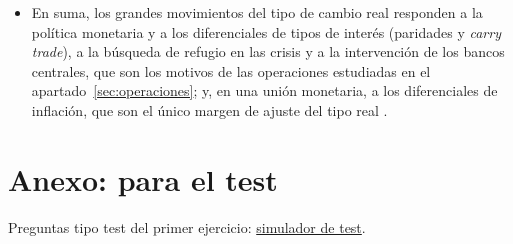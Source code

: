 \documentclass[11pt]{article}
\begin{document}
\begin{itemize}
\begin{itemize}
  \item \emph{libra}: se apreció con fuerza entre 1996 y 1998 y se mantuvo alta hasta 2007 (135~en abril de 2000, su máximo); perdió una cuarta parte en la crisis de 2008 y volvió a caer tras el referéndum del \emph{Brexit} de junio de 2016, hasta su mínimo de octubre de 2016 (94). Desde entonces se ha recuperado hasta 111;
  \item \emph{España}: dentro del euro no tiene tipo de cambio nominal propio, pero sí efectivo real, por 2~razones: frente a sus socios del euro, que pesan mucho en su cesta, solo se mueven los precios relativos (por eso su línea oscila menos que la de la zona del euro), y su inflación difiere de la de sus socios. Entre 2000 (90) y 2008 (109) se apreció en términos reales más que la zona del euro por una inflación mayor que la media, sin que el tipo nominal pudiera corregirlo; la devaluación interna tras 2012 y la depreciación del euro lo devolvieron a 97~en 2015. En septiembre de 2026 estaba en 104, algo por encima de la zona del euro (103).
  \end{itemize}
\item En suma, los grandes movimientos del tipo de cambio real responden a la política monetaria y a los diferenciales de tipos de interés (paridades y \emph{carry trade}), a la búsqueda de refugio en las crisis y a la intervención de los bancos centrales, que son los motivos de las operaciones estudiadas en el apartado~\ref{sec:operaciones}; y, en una unión monetaria, a los diferenciales de inflación, que son el único margen de ajuste del tipo real  .
\end{itemize}

\section{Anexo: para el test}\label{anexo:test}

\begin{anotaciones}
Preguntas tipo test del primer ejercicio: \href{https://www.victorgutierrezmarcos.es/oposicion/temario/primer-ejercicio/test/simulador.html?tema=3.B.13}{simulador de test}.
\end{anotaciones}

\bibliografia
\end{document}
